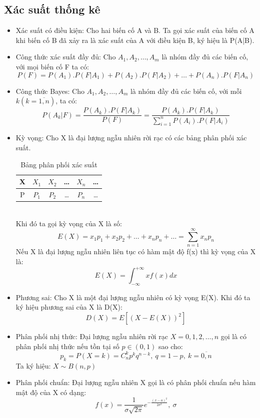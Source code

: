 \subsection{Xác suất thống kê}
\begin{itemize}
  \item Xác suất có điều kiện: Cho hai biến cố A và B. Ta gọi xác suất của biến
  cố A khi biến cố B đã xảy ra là xác suất của A với điều kiện B, ký hiệu là P(A|B).
  \item Công thức xác suất đầy đủ: Cho $A_1, A_2, \dots,A_m$ là nhóm đầy đủ các
  biến cố, với mọi biến cố F ta có:\\
  \[
  P(F) = P(A_1).P(F|A_1) + P(A_2).P(F|A_2) + \dots + P(A_n).P(F|A_n) 
  \]
  \item Công thức Bayes: Cho $A_1, A_2, \dots,A_m$ là nhóm đầy đủ các biến cố,
  với mỗi $k (k = \overline{1,n})$, ta có:
  \[
  P(A_k|F) = \frac{P(A_k).P(F|A_k)}{P(F)} = \frac{P(A_k).P(F|
  A_k)}{\sum_{i=1}^{n} P(A_i).P(F| A_i)}
  \]
  \item Kỳ vọng: Cho X là đại lượng ngẫu nhiên rời rạc có các bảng phân phối xác
  suất.
  \begin{table}[h]
  \centering
  \begin{tabular}{|c|c|c|c|c|c|}
  \hline
  X & $X_1$ & $X_2$ & \dots & $X_n$ & \dots\\
  \hline
  P & $P_1$ & $P_2$ & \dots & $P_n$ & \dots\\
  \hline
  \end{tabular}
  \caption{Bảng phân phối xác suất}
  \end{table}\\
  Khi đó ta gọi kỳ vọng của X là số:
  \[
  E(X) = x_1p_1 + x_2p_2 + \dots + x_np_n + \dots = \sum_{n=1}^{\infty} x_np_n
  \]
  Nếu X là đại lượng ngẫu nhiên liên tục có hàm mật độ f(x) thì kỳ vọng của X
  là:
  \[
  E(X) = \int_{-\infty}^{+\infty} xf(x) dx
  \]
  \item Phương sai: Cho X là một đại lượng ngẫu nhiên có kỳ vọng E(X). Khi đó ta
  ký hiệu phương sai của X là D(X):
  \[ D(X) = E[(X-E(X))^2] \]
  \item Phân phối nhị thức: Đại lượng ngẫu nhiên rời rạc $X={0,1,2,\dots,n}$ gọi
  là có phân phối nhị thức nếu tồn tại số $p \in (0,1)$ sao cho:
  \[ p_k = P(X=k) = C_{n}^{k}p^kq^{n-k},\:q=1-p,\:k=\overline{0,n} \]
  Ta ký hiệu: $X \sim B(n,p)$ 
  \item Phân phối chuẩn: Đại lượng ngẫu nhiên X gọi là có phân phối chuẩn nếu
  hàm mật độ của X có dạng:
  \[ f(x) = \frac{1}{\sigma \sqrt{2\pi}}e^{-\frac{(x-a)^2}{2\sigma^2}},\:\sigma
\]
\end{itemize}
